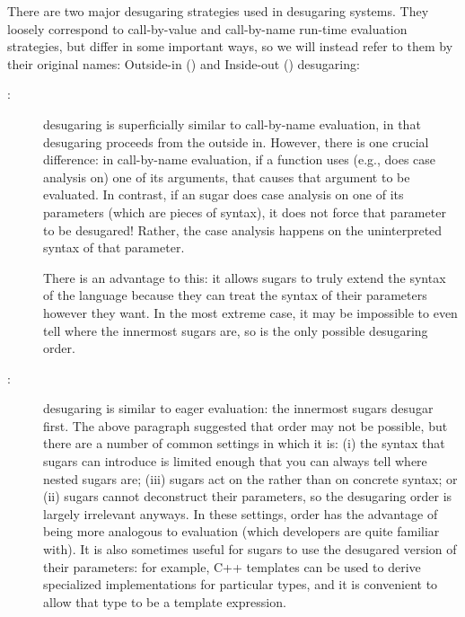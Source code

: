 There are two major desugaring strategies used in desugaring systems.
They loosely correspond to call-by-value and call-by-name run-time evaluation strategies, but
differ in some important ways, so we will instead refer
to them by their original names: Outside-in () and
Inside-out () desugaring:~\cite{expansion-order}
\begin{description}
\item[:]  desugaring is superficially similar to call-by-name
  evaluation, in that desugaring proceeds from the outside in.
  However, there is one crucial difference: in call-by-name evaluation, if a
  function uses (e.g., does case analysis on) one of its
  arguments, that causes that argument to be evaluated. In contrast,
  if an  sugar does case analysis on one of its
  parameters (which are pieces of syntax), it does not force that
  parameter to be desugared! Rather, the case analysis happens on the
  uninterpreted syntax of that parameter.

  There is an advantage to this: it allows sugars to truly extend the
  syntax of the language because they can treat the syntax of their
  parameters however they want.
  In the most extreme case, it may be impossible
  to even tell where the innermost sugars are, so  is the only
  possible desugaring order.
\item[:]  desugaring is similar to eager evaluation: the
  innermost sugars desugar first. The above paragraph suggested that
   order may not be possible, but there are a number of common
  settings in which it is: (i) the syntax that sugars can introduce is
  limited enough that you can always tell where nested sugars are;
  (iii) sugars act on the  rather than on concrete syntax; or
  (ii) sugars cannot deconstruct their parameters, so the desugaring
  order is largely irrelevant anyways. In these settings, 
  order has the advantage of being more analogous to evaluation (which
  developers are quite familiar with). It is
  also sometimes useful for sugars to use the desugared version of
  their parameters: for example, C++ templates can be used to derive
  specialized implementations for particular types, and it is
  convenient to allow that type to be a template expression.
\end{description}



